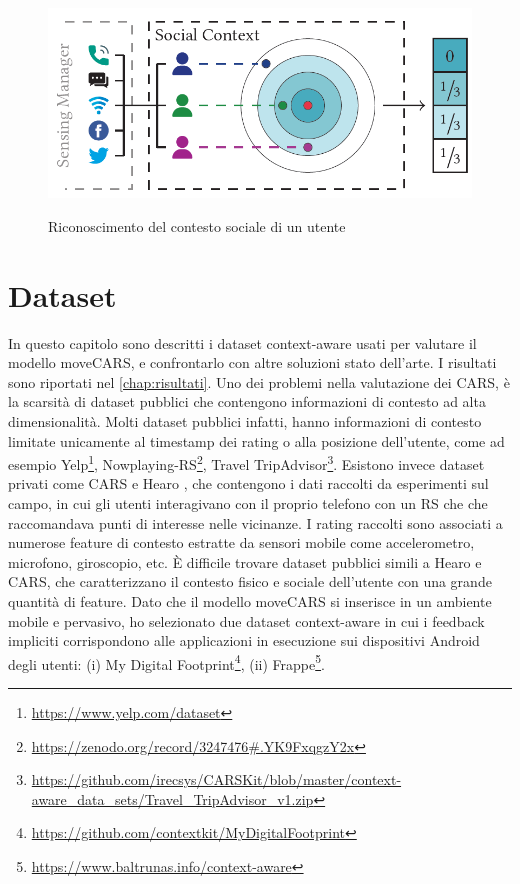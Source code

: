 \documentclass[12pt,italian]{report}
\begin{document}
\begin{figure}
  \centering
  \includegraphics[scale=0.80]{immagini/ego-array.png}
  \caption{Riconoscimento del contesto sociale di un utente}
  \label{fig:ego-array}	
  \cite{ego-net}
\end{figure}

% 
% 
\chapter{Dataset} \label{chap:datasets}
In questo capitolo sono descritti i dataset context-aware usati per valutare il modello moveCARS, e confrontarlo con altre soluzioni stato dell'arte. I risultati sono riportati nel \autoref{chap:risultati}. Uno dei problemi nella valutazione dei CARS, è la scarsità di dataset pubblici che contengono informazioni di contesto ad alta dimensionalità. Molti dataset pubblici infatti, hanno informazioni di contesto limitate unicamente al timestamp dei rating o alla posizione dell'utente, come ad esempio Yelp\footnote{\url{https://www.yelp.com/dataset}}, Nowplaying-RS\footnote{\url{https://zenodo.org/record/3247476\#.YK9FxqgzY2x}}, Travel TripAdvisor\footnote{\url{https://github.com/irecsys/CARSKit/blob/master/context-aware_data_sets/Travel_TripAdvisor_v1.zip}}. Esistono invece dataset privati come CARS \cite{context-aware-deep-learning} e Hearo \cite{latent-context}, che contengono i dati raccolti da esperimenti sul campo, in cui gli utenti interagivano con il proprio telefono con un RS che che raccomandava punti di interesse nelle vicinanze. I rating raccolti sono associati a numerose feature di contesto estratte da sensori mobile come accelerometro, microfono, giroscopio, etc.
\`E difficile trovare dataset pubblici simili a Hearo e CARS, che caratterizzano il contesto fisico e sociale dell'utente con una grande quantità di feature. Dato che il modello moveCARS si inserisce in un ambiente mobile e pervasivo, ho selezionato due dataset context-aware in cui i feedback impliciti corrispondono alle applicazioni in esecuzione sui dispositivi Android degli utenti: (i) My Digital Footprint\footnote{\url{https://github.com/contextkit/MyDigitalFootprint}}, (ii) Frappe\footnote{\url{https://www.baltrunas.info/context-aware}}.
\end{document}
